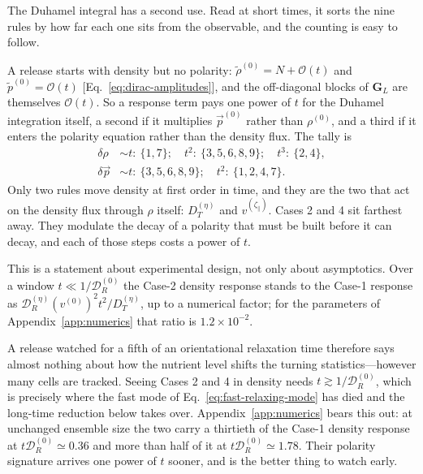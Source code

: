 \documentclass[
  reprint,
  superscriptaddress,
  amsmath,
  amssymb,
  aps,
  pre,
  nofootinbib,
  floatfix
]{revtex4-2}
\newcommand{\pv}{\vec p}
\newcommand{\ord}{\mathcal O}
\newcommand{\DR}{\mathcal D_R^{(0)}}
\newcommand{\zp}{\zeta_\parallel}
\begin{document}
The Duhamel integral has a second use.  Read at short times, it sorts the
nine rules by how far each one sits from the observable, and the counting is
easy to follow.

A release starts with density but no polarity:
$\tilde\rho^{(0)}=N+\ord(t)$ and $\tilde p^{(0)}=\ord(t)$
[Eq.~\eqref{eq:dirac-amplitudes}], and the off-diagonal blocks of
$\mathbf G_L$ are themselves $\ord(t)$.  So a response term pays one power of
$t$ for the Duhamel integration itself, a second if it multiplies $\pv^{(0)}$
rather than $\rho^{(0)}$, and a third if it enters the polarity equation
rather than the density flux.  The tally is
\begin{equation}
\begin{aligned}
 \delta\rho&\sim t:\ \{1,7\};
 \quad t^2:\ \{3,5,6,8,9\};
 \quad t^3:\ \{2,4\},\\
 \delta\pv&\sim t:\ \{3,5,6,8,9\};
 \quad t^2:\ \{1,2,4,7\}.
\end{aligned}
 \label{eq:transient-hierarchy}
\end{equation}
Only two rules move density at first order in time, and they are the two that
act on the density flux through $\rho$ itself: $D_T^{(\eta)}$ and
$v^{(\zp)}$.  Cases 2 and 4 sit farthest away.  They modulate the decay of a
polarity that must be built before it can decay, and each of those steps costs
a power of $t$.

This is a statement about experimental design, not only about asymptotics.
Over a window $t\ll1/\DR$ the Case-2 density response stands to the Case-1
response as $\mathcal D_R^{(\eta)}(v^{(0)})^2t^2/D_T^{(\eta)}$, up to a
numerical factor; for the parameters of Appendix~\ref{app:numerics} that
ratio is $1.2\times10^{-2}$.

A release watched for a fifth of an orientational relaxation time therefore
says almost nothing about how the nutrient level shifts the turning
statistics---however many cells are tracked.  Seeing Cases 2 and 4 in density
needs $t\gtrsim1/\DR$, which is precisely where the fast mode of
Eq.~\eqref{eq:fast-relaxing-mode} has died and the long-time reduction below
takes over.  Appendix~\ref{app:numerics} bears this out: at unchanged
ensemble size the two carry a thirtieth of the Case-1 density response at
$t\DR\simeq0.36$ and more than half of it at $t\DR\simeq1.78$.  Their polarity
signature arrives one power of $t$ sooner, and is the better thing to watch
early.
\end{document}
